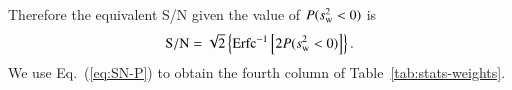 \documentclass[traditabstract, longauth]{aa}
\newcommand{\1}{\'\i }
\begin{document}
Therefore the equivalent S/N given the value of $P(s^{2}_{\rm w}<0)$ is
\begin{eqnarray}
{\rm S/N}=\sqrt{2}\left\{{\rm Erfc}^{-1}\left[2P(s^{2}_{\rm w}<0) \right] \right\}. \label{eq:SN-P}
\end{eqnarray}
We use Eq.~(\ref{eq:SN-P}) to obtain the fourth column of Table~\ref{tab:stats-weights}.

\raggedright
\end{document}
